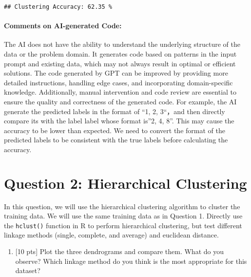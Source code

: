 \documentclass[
]{article}
\providecommand{\tightlist}{%
  \setlength{\itemsep}{0pt}\setlength{\parskip}{0pt}}
\begin{document}
\begin{verbatim}
## Clustering Accuracy: 62.35 %
\end{verbatim}

\hypertarget{comments-on-ai-generated-code}{%
\paragraph{Comments on AI-generated
Code:}\label{comments-on-ai-generated-code}}

The AI does not have the ability to understand the underlying structure
of the data or the problem domain. It generates code based on patterns
in the input prompt and existing data, which may not always result in
optimal or efficient solutions. The code generated by GPT can be
improved by providing more detailed instructions, handling edge cases,
and incorporating domain-specific knowledge. Additionally, manual
intervention and code review are essential to ensure the quality and
correctness of the generated code. For example, the AI generate the
predicted labels in the format of ``1, 2, 3``，and then directly compare
its with the label label whose format is''2, 4, 8''. This may cause the
accuracy to be lower than expected. We need to convert the format of the
predicted labels to be consistent with the true labels before
calculating the accuracy.

\bigskip

\hypertarget{question-2-hierarchical-clustering}{%
\section{Question 2: Hierarchical
Clustering}\label{question-2-hierarchical-clustering}}

In this question, we will use the hierarchical clustering algorithm to
cluster the training data. We will use the same training data as in
Question 1. Directly use the \texttt{hclust()} function in R to perform
hierarchical clustering, but test different linkage methods (single,
complete, and average) and euclidean distance.

\begin{enumerate}
\def\labelenumi{\alph{enumi}.}
\tightlist
\item
  {[}10 pts{]} Plot the three dendrograms and compare them. What do you
  observe? Which linkage method do you think is the most appropriate for
  this dataset?
\end{enumerate}
\end{document}
